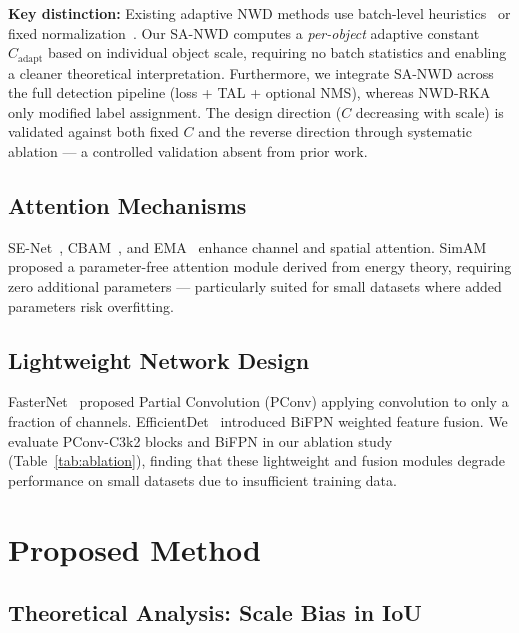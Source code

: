 \documentclass[journal]{IEEEtran}
\begin{document}
\textbf{Key distinction:} Existing adaptive NWD methods use batch-level heuristics~\cite{zhong2025asanwd} or fixed normalization~\cite{lei2025rfwnet,wang2022nwd}. Our SA-NWD computes a \emph{per-object} adaptive constant $C_{\text{adapt}}$ based on individual object scale, requiring no batch statistics and enabling a cleaner theoretical interpretation. Furthermore, we integrate SA-NWD across the full detection pipeline (loss + TAL + optional NMS), whereas NWD-RKA~\cite{wang2022nwd} only modified label assignment. The design direction ($C$ decreasing with scale) is validated against both fixed $C$ and the reverse direction through systematic ablation --- a controlled validation absent from prior work.

\subsection{Attention Mechanisms}

SE-Net~\cite{hu2018squeeze}, CBAM~\cite{woo2018cbam}, and EMA~\cite{ouyang2023efficient} enhance channel and spatial attention. SimAM~\cite{yang2021simam} proposed a parameter-free attention module derived from energy theory, requiring zero additional parameters --- particularly suited for small datasets where added parameters risk overfitting.

\subsection{Lightweight Network Design}

FasterNet~\cite{chen2023run} proposed Partial Convolution (PConv) applying convolution to only a fraction of channels. EfficientDet~\cite{tan2020efficientdet} introduced BiFPN weighted feature fusion. We evaluate PConv-C3k2 blocks and BiFPN in our ablation study (Table~\ref{tab:ablation}), finding that these lightweight and fusion modules degrade performance on small datasets due to insufficient training data.

\section{Proposed Method}
\label{sec:method}

\subsection{Theoretical Analysis: Scale Bias in IoU}
\end{document}
